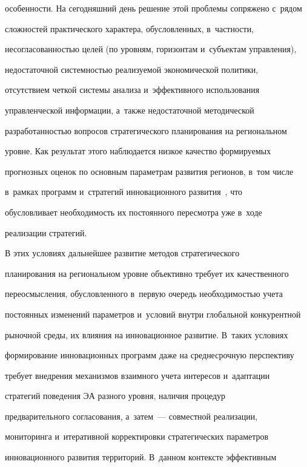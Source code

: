 особенности. На сегодняшний день решение этой проблемы сопряжено с~рядом 


сложностей практического характера, обусловленных, в~част\-ности, 


несогласованностью целей (по уровням, горизонтам и~субъектам управ\-ле\-ния), 


недостаточной сис\-тем\-ностью реа\-ли\-зу\-емой экономической политики, 


отсутствием четкой сис\-те\-мы анализа и~эффективного использования 


управленческой информации, а~так\-же недостаточной методической 


разработанностью вопросов стратегического планирования на региональном 


уровне. Как результат этого наблюдается низкое качество формируемых 


прогнозных оценок по основным па\-ра\-мет\-рам развития регионов, в~том числе 


в~рамках программ и~стратегий инновационного развития~\cite{1-or}, что 


обуслов\-ли\-ва\-ет не\-об\-хо\-ди\-мость их постоянного пересмотра уже в~ходе 


реализации стратегий.


  


   В этих условиях дальнейшее развитие методов стратегического 


планирования на региональном уровне объективно требует их качественного 


переосмысления, обуслов\-лен\-но\-го в~первую очередь необходимостью учета 


постоянных изменений параметров и~условий внут\-ри глобальной конкурентной 


рыночной среды, их влияния на инновационное развитие. В~таких условиях 


формирование инновационных программ даже на среднесрочную перспективу 


требует внедрения механизмов взаимного учета интересов и~адаптации 


стратегий поведения ЭА разного уровня, наличия процедур 


предварительного согласования, а~затем~--- совместной реализации, 


мониторинга и~итеративной корректировки стратегических параметров 


инновационного развития территорий. В~данном контексте эффективным 


